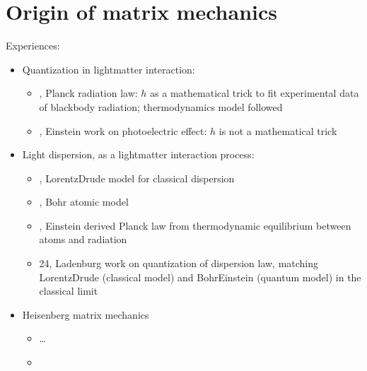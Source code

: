 \documentclass[letterpaper,10pt,english]{jupyterBook}
\begin{document}
\section{Origin of matrix mechanics}
\label{\detokenize{ch/quantum-mechanics/history/origin-matrix-mechanics:origin-of-matrix-mechanics}}\label{\detokenize{ch/quantum-mechanics/history/origin-matrix-mechanics:quantum-mehcanics-history-origin-matrix-mechanics}}\label{\detokenize{ch/quantum-mechanics/history/origin-matrix-mechanics::doc}}
\sphinxAtStartPar
Experiences:
\begin{itemize}
\item {} 
\sphinxAtStartPar
Quantization in light\sphinxhyphen{}matter interaction:
\begin{itemize}
\item {} 
, Planck radiation law: \(h\) as a mathematical trick to fit experimental data of black\sphinxhyphen{}body radiation; thermodynamics model followed

\item {} 
, Einstein work on photoelectric effect: \(h\) is not a mathematical trick

\end{itemize}

\item {} 
\sphinxAtStartPar
Light dispersion, as a light\sphinxhyphen{}matter interaction process:
\begin{itemize}
\item {} 
, Lorentz\sphinxhyphen{}Drude model for classical dispersion

\item {} 
, Bohr atomic model

\item {} 
, Einstein derived Planck law from thermodynamic equilibrium between atoms and radiation

\item {} 
\sphinxhyphen{}24, Ladenburg work on quantization of dispersion law, matching Lorentz\sphinxhyphen{}Drude (classical model) and Bohr\sphinxhyphen{}Einstein (quantum model) in the classical limit

\end{itemize}

\item {} 
\sphinxAtStartPar
Heisenberg matrix mechanics
\begin{itemize}
\item {} 
\sphinxAtStartPar
…

\item {} 
\sphinxAtStartPar
{\hyperref[\detokenize{ch/quantum-mechanics/history/heisenberg-reinterpretation:quantum-mechanics-history-heisenberg-reinterpretation}]{}}

\end{itemize}

\end{itemize}
\end{document}
